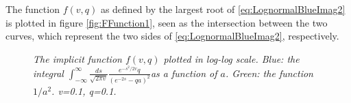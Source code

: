 \documentclass{article}
\begin{document}
The function $f(v,q)$ as defined by the largest root of
\eqref{eq:LognormalBlueImag2} is plotted in figure
\ref{fig:FFunction1}, seen as the intersection between the two curves,
which represent the two sides of \eqref{eq:LognormalBlueImag2},
respectively.
\begin{figure}[htb!]
  \centering
  \caption{\small \it The implicit function $f(v, q)$ plotted in
    log-log scale. Blue: the integral $\int_{-\infty}^{\infty}
    \frac{ds}{\sqrt{2\pi v}}
    \frac{
      e^{-s^2/2v} q
    }{
      (e^{-2s} - qa)^2
    }$as a function of $a$. Green: the function $1/a^2$. v=0.1, q=0.1.
}
  \label{fig:FFunction}
\end{figure}
\end{document}
